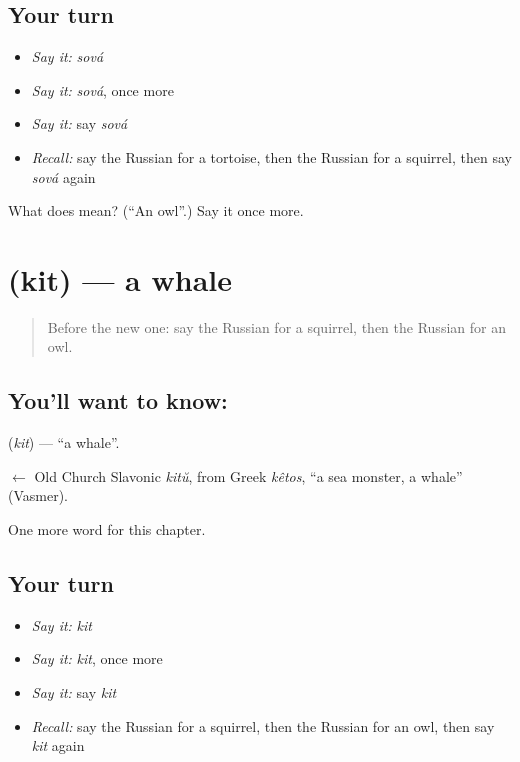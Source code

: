 \subsection*{Your turn}
\begin{itemize}
\raggedright
  \item \emph{Say it:} \emph{sová}
  \item \emph{Say it:} \emph{sová}, once more
  \item \emph{Say it:} say \emph{sová}
  \item \emph{Recall:} say the Russian for a tortoise, then the Russian for a squirrel, then say \emph{sová} again
\end{itemize}

\begin{tcolorbox}[breakable,colback=teal!4,colframe=teal!35!black,title={Before you move on}]
What does  mean? (\textquotedblleft{}An owl\textquotedblright{}.) Say it once more.
\end{tcolorbox}
\section[\texorpdfstring{\ru{кит} (kit)}{кит (kit)}]{ (kit) — a whale}

\label{lesson:RU-C118-whale}



\begin{quote}
Before the new one: say the Russian for a squirrel, then the Russian for an owl.
\end{quote}

\subsection*{You'll want to know: }
\textbf{} (\emph{kit}) — \textquotedblleft{}a whale\textquotedblright{}.

\begin{cousinweb}
\textbf{} $\leftarrow$ Old Church Slavonic \emph{kitŭ}, from Greek \emph{kêtos}, \textquotedblleft{}a sea monster, a whale\textquotedblright{} (Vasmer).
\end{cousinweb}

\begin{grammarlens}[title={What you've built}]
One more word for this chapter.
\end{grammarlens}

\subsection*{Your turn}
\begin{itemize}
\raggedright
  \item \emph{Say it:} \emph{kit}
  \item \emph{Say it:} \emph{kit}, once more
  \item \emph{Say it:} say \emph{kit}
  \item \emph{Recall:} say the Russian for a squirrel, then the Russian for an owl, then say \emph{kit} again
\end{itemize}

